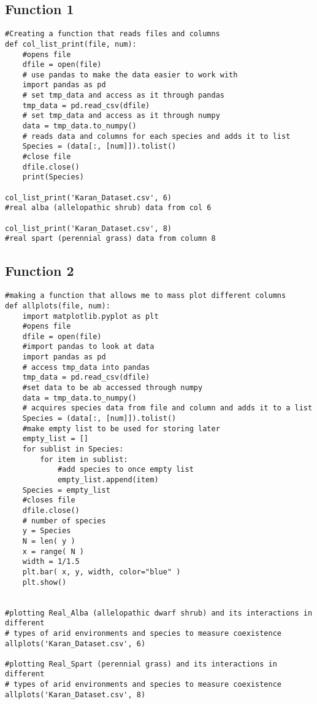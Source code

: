 \documentclass[letterpaper]{article}
\begin{document}
\subsection{Function 1 }
\begin{verbatim}
#Creating a function that reads files and columns
def col_list_print(file, num):
    #opens file
    dfile = open(file)
    # use pandas to make the data easier to work with
    import pandas as pd
    # set tmp_data and access as it through pandas
    tmp_data = pd.read_csv(dfile)
    # set tmp_data and access as it through numpy
    data = tmp_data.to_numpy()
    # reads data and columns for each species and adds it to list
    Species = (data[:, [num]]).tolist()
    #close file
    dfile.close()
    print(Species)

col_list_print('Karan_Dataset.csv', 6)
#real alba (allelopathic shrub) data from col 6

col_list_print('Karan_Dataset.csv', 8)
#real spart (perennial grass) data from column 8

\end{verbatim}

\subsection{Function 2 }
\begin{verbatim}
#making a function that allows me to mass plot different columns 
def allplots(file, num):
    import matplotlib.pyplot as plt
    #opens file
    dfile = open(file)
    #import pandas to look at data
    import pandas as pd
    # access tmp_data into pandas
    tmp_data = pd.read_csv(dfile)
    #set data to be ab accessed through numpy
    data = tmp_data.to_numpy()
    # acquires species data from file and column and adds it to a list
    Species = (data[:, [num]]).tolist()
    #make empty list to be used for storing later
    empty_list = []
    for sublist in Species:
        for item in sublist:
            #add species to once empty list
            empty_list.append(item)
    Species = empty_list
    #closes file
    dfile.close()
    # number of species
    y = Species
    N = len( y )
    x = range( N )
    width = 1/1.5
    plt.bar( x, y, width, color="blue" )
    plt.show()


#plotting Real_Alba (allelopathic dwarf shrub) and its interactions in different
# types of arid environments and species to measure coexistence
allplots('Karan_Dataset.csv', 6)

#plotting Real_Spart (perennial grass) and its interactions in different
# types of arid environments and species to measure coexistence
allplots('Karan_Dataset.csv', 8)

\end{verbatim}
\end{document}
